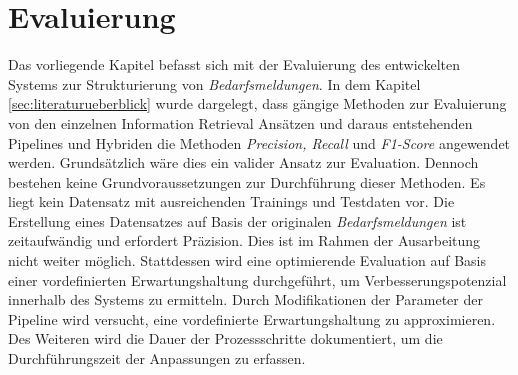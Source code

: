 \chapter{Evaluierung}
\label{chap:evaluation}
Das vorliegende Kapitel befasst sich mit der Evaluierung des entwickelten Systems zur Strukturierung von \emph{Bedarfsmeldungen}. In dem Kapitel \ref{sec:literaturueberblick} wurde dargelegt, dass gängige Methoden zur Evaluierung von den einzelnen Information Retrieval Ansätzen und daraus entstehenden Pipelines und Hybriden die Methoden \emph{Precision, Recall} und \emph{F1-Score} angewendet werden. Grundsätzlich wäre dies ein valider Ansatz zur Evaluation. Dennoch bestehen keine Grundvoraussetzungen zur Durchführung dieser Methoden. Es liegt kein Datensatz mit ausreichenden Trainings und Testdaten vor. Die Erstellung eines Datensatzes auf Basis der originalen \emph{Bedarfsmeldungen} ist zeitaufwändig und erfordert Präzision. Dies ist im Rahmen der Ausarbeitung nicht weiter möglich. Stattdessen wird eine optimierende Evaluation auf Basis einer vordefinierten Erwartungshaltung durchgeführt, um Verbesserungspotenzial innerhalb des Systems zu ermitteln. Durch Modifikationen der Parameter der Pipeline wird versucht, eine vordefinierte Erwartungshaltung zu approximieren. Des Weiteren wird die Dauer der Prozessschritte dokumentiert, um die Durchführungszeit der Anpassungen zu erfassen.






